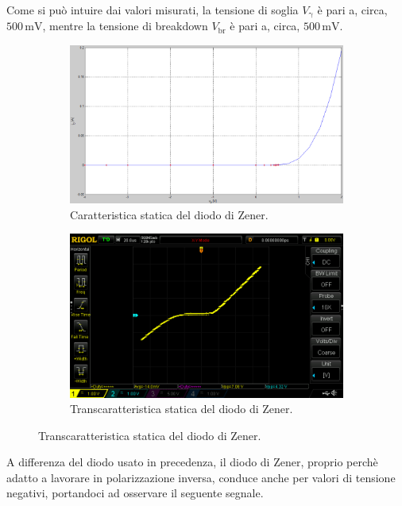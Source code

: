 \documentclass[a4paper]{article}
\begin{document}
				Come si può intuire dai valori misurati, la tensione di soglia $ V_{\mathrm{\gamma}} $ è pari a, circa, $ 500 \, \mathrm{mV} $, mentre la tensione di breakdown $ V_{\mathrm{br}} $ è pari a, circa, $ 500 \, \mathrm{mV} $.
				\begin{figure}[h!]
					\centering
					\begin{subfigure}{0.4\textwidth}
						\centering
						\includegraphics[scale=0.3]{caratteristicheStaticheDiodoDiZenerCaratteristica}
						\caption{Caratteristica statica del diodo di Zener.}
					\end{subfigure}
					\begin{subfigure}{0.4\textwidth}
						\centering
						\includegraphics[scale=0.5]{caratteristicheStaticheDiodoDiZenerTranscaratteristica}
						\caption{Transcaratteristica statica del diodo di Zener.}
					\end{subfigure}
					\label{fig:caratteristicheStaticheDiodoDiZener}
				\end{figure}
				A differenza del diodo usato in precedenza, il diodo di Zener, proprio perchè adatto a lavorare in polarizzazione inversa, conduce anche per valori di tensione negativi, portandoci ad osservare il seguente segnale.		
\end{document}

